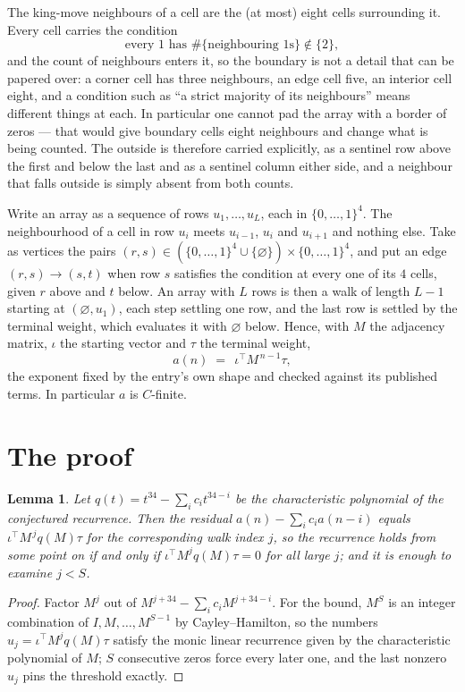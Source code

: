 \documentclass[11pt,a4paper]{article}
\theoremstyle{plain}
\newtheorem{lemma}[theorem]{Lemma}
\theoremstyle{definition}
\begin{document}
The king-move neighbours of a cell are the (at most) eight cells surrounding it. Every cell
carries the condition
\[
\text{every }1\text{ has }\#\{\text{neighbouring }1\text{s}\}\notin\{2\},
\]
and the count of neighbours enters it, so the boundary is not a detail that can be papered
over: a corner cell has three neighbours, an edge cell five, an interior cell eight, and a
condition such as ``a strict majority of its neighbours'' means different things at each. In
particular one cannot pad the array with a border of zeros --- that would give boundary cells
eight neighbours and change what is being counted. The outside is therefore carried
explicitly, as a sentinel row above the first and below the last and as a sentinel column
either side, and a neighbour that falls outside is simply absent from both counts.

Write an array as a sequence of rows $u_1,\dots,u_L$, each in
$\{0,\dots,1\}^{4}$. The neighbourhood of a cell in row $u_i$ meets $u_{i-1}$,
$u_i$ and $u_{i+1}$ and nothing else. Take as vertices the pairs
$(r,s)\in(\{0,\dots,1\}^{4}\cup\{\varnothing\})\times\{0,\dots,1\}^{4}$,
and put an edge $(r,s)\to(s,t)$ when row $s$ satisfies the condition at every one of its
$4$ cells, given $r$ above and $t$ below. An array with $L$ rows is then a walk of length
$L-1$ starting at $(\varnothing,u_1)$, each step settling one row, and the last row is
settled by the terminal weight, which evaluates it with $\varnothing$ below. Hence,
with $M$ the adjacency matrix, $\iota$ the starting vector and $\tau$ the terminal weight,
\[
a(n)\;=\;\,\iota^{\!\top}M^{\,n-1}\tau ,
\]
the exponent fixed by the entry's own shape and checked against its published terms. In
particular $a$ is $C$-finite.

\section{The proof}

\begin{lemma}\label{lem:crit}
Let $q(t)=t^{34}-\sum_i c_it^{34-i}$ be the characteristic polynomial of the
conjectured recurrence. Then the residual $a(n)-\sum_ic_ia(n-i)$ equals
$\iota^{\!\top}M^{\,j}q(M)\tau$ for the corresponding walk index $j$, so the
recurrence holds from some point on if and only if $\iota^{\!\top}M^{j}q(M)\tau=0$ for all
large $j$; and it is enough to examine $j<S$.
\end{lemma}

\begin{proof}
Factor $M^{j}$ out of $M^{j+34}-\sum_ic_iM^{j+34-i}$. For the bound, $M^{S}$
is an integer combination of $I,M,\dots,M^{S-1}$ by Cayley--Hamilton, so the numbers
$u_j=\iota^{\!\top}M^{j}q(M)\tau$ satisfy the monic linear recurrence given by the
characteristic polynomial of $M$; $S$ consecutive zeros force every later one, and the last
nonzero $u_j$ pins the threshold exactly.
\end{proof}
\end{document}
